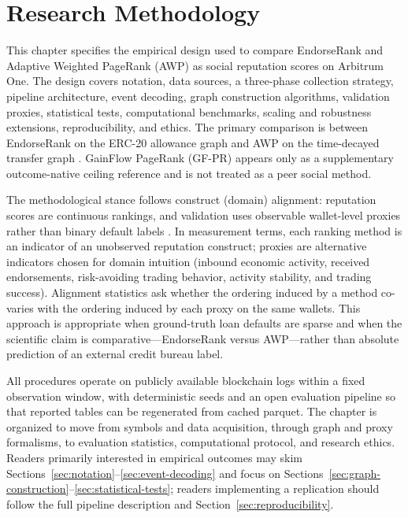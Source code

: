 \chapter{Research Methodology}
\label{ch:methodology}

This chapter specifies the empirical design used to compare EndorseRank and Adaptive Weighted PageRank (AWP) as social reputation scores on Arbitrum One. The design covers notation, data sources, a three-phase collection strategy, pipeline architecture, event decoding, graph construction algorithms, validation proxies, statistical tests, computational benchmarks, scaling and robustness extensions, reproducibility, and ethics. The primary comparison is between EndorseRank on the ERC-20 allowance graph and AWP on the time-decayed transfer graph . GainFlow PageRank (GF-PR) appears only as a supplementary outcome-native ceiling reference and is not treated as a peer social method.

The methodological stance follows construct (domain) alignment: reputation scores are continuous rankings, and validation uses observable wallet-level proxies rather than binary default labels . In measurement terms, each ranking method is an indicator of an unobserved reputation construct; proxies are alternative indicators chosen for domain intuition (inbound economic activity, received endorsements, risk-avoiding trading behavior, activity stability, and trading success). Alignment statistics ask whether the ordering induced by a method co-varies with the ordering induced by each proxy on the same wallets. This approach is appropriate when ground-truth loan defaults are sparse and when the scientific claim is comparative---EndorseRank versus AWP---rather than absolute prediction of an external credit bureau label.

All procedures operate on publicly available blockchain logs within a fixed observation window, with deterministic seeds and an open evaluation pipeline so that reported tables can be regenerated from cached parquet. The chapter is organized to move from symbols and data acquisition, through graph and proxy formalisms, to evaluation statistics, computational protocol, and research ethics. Readers primarily interested in empirical outcomes may skim Sections~\ref{sec:notation}--\ref{sec:event-decoding} and focus on Sections~\ref{sec:graph-construction}--\ref{sec:statistical-tests}; readers implementing a replication should follow the full pipeline description and Section~\ref{sec:reproducibility}.

